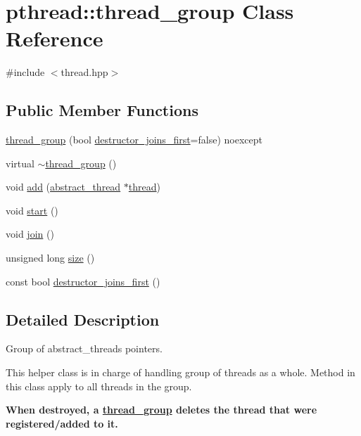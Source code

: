 \hypertarget{classpthread_1_1thread__group}{\section{pthread\+:\+:thread\+\_\+group Class Reference}
\label{classpthread_1_1thread__group}
}


{\ttfamily \#include $<$thread.\+hpp$>$}

\subsection*{Public Member Functions}
\begin{DoxyCompactItemize}
\item 
\hyperlink{classpthread_1_1thread__group_a9aeb2ffef16dc16d2753f2e6c63ff466}{thread\+\_\+group} (bool \hyperlink{classpthread_1_1thread__group_a67df7bb484fb8657228a909a126489d3}{destructor\+\_\+joins\+\_\+first}=false) noexcept
\item 
virtual \hyperlink{classpthread_1_1thread__group_a2aeeb86d1523e2a7c175df3162331e4f}{$\sim$thread\+\_\+group} ()
\item 
void \hyperlink{classpthread_1_1thread__group_ae9fa9ce6e7b4c2222d04a446b3c23ca0}{add} (\hyperlink{classpthread_1_1abstract__thread}{abstract\+\_\+thread} $\ast$\hyperlink{classpthread_1_1thread}{thread})
\item 
void \hyperlink{classpthread_1_1thread__group_aaba00cf80d72cd986526384482457968}{start} ()
\item 
void \hyperlink{classpthread_1_1thread__group_a39937a77e1059e352c9b39407a866f6e}{join} ()
\item 
unsigned long \hyperlink{classpthread_1_1thread__group_a4b1a04ee731bba608193b089cc1d50a1}{size} ()
\item 
const bool \hyperlink{classpthread_1_1thread__group_a67df7bb484fb8657228a909a126489d3}{destructor\+\_\+joins\+\_\+first} ()
\end{DoxyCompactItemize}


\subsection{Detailed Description}
Group of abstract\+\_\+threads pointers.

This helper class is in charge of handling group of threads as a whole. Method in this class apply to all threads in the group.

{\bfseries When destroyed, a \hyperlink{classpthread_1_1thread__group}{thread\+\_\+group} deletes the thread that were registered/added to it.}


